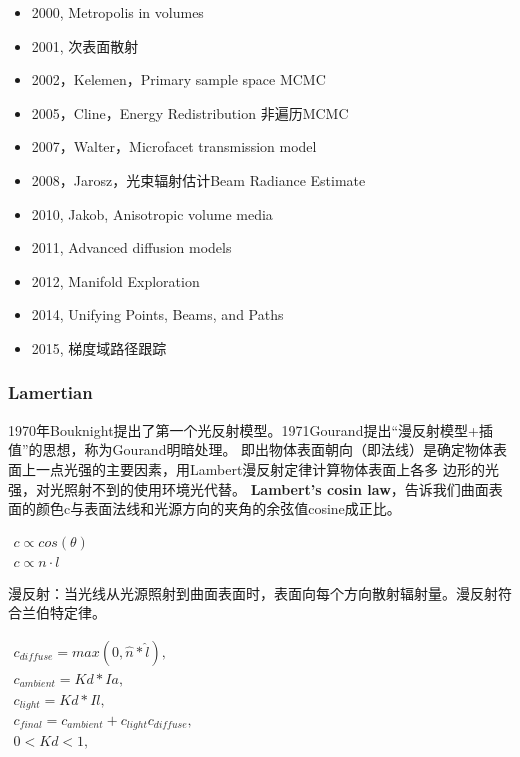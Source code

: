 \begin{itemize}
    \item {2000, Metropolis in volumes}
    \item {2001, 次表面散射}
    \item {2002，Kelemen，Primary sample space MCMC}
    \item {2005，Cline，Energy Redistribution 非遍历MCMC}
    \item {2007，Walter，Microfacet transmission model}
    \item {2008，Jarosz，光束辐射估计Beam Radiance Estimate}
    \item {2010, Jakob, Anisotropic volume media}
    \item {2011, Advanced diffusion models}
    \item {2012, Manifold Exploration}
    \item {2014, Unifying Points, Beams, and Paths}
    \item {2015, 梯度域路径跟踪}
\end{itemize}

\subsubsection{Lamertian}
1970年Bouknight提出了第一个光反射模型。1971Gourand提出“漫反射模型+插值”的思想，称为Gourand明暗处理。
即出物体表面朝向（即法线）是确定物体表面上一点光强的主要因素，用Lambert漫反射定律计算物体表面上各多
边形的光强，对光照射不到的使用环境光代替。
\textbf{Lambert's cosin law}，告诉我们曲面表面的颜色c与表面法线和光源方向的夹角的余弦值cosine成正比。

\begin{math}
\begin{aligned}
c \propto cos(\theta) \\
c \propto n \cdot l 
\end{aligned}
\end{math}

漫反射：当光线从光源照射到曲面表面时，表面向每个方向散射辐射量。漫反射符合兰伯特定律。

\begin{math}
\begin{aligned}    
c_{diffuse} = max(0, \hat{n} * \hat{l}), \\
c_{ambient} = Kd * Ia, \\
c_{light} = Kd * Il, \\ 
c_{final} = c_{ambient} + c_{light}c_{diffuse}, \\
0 < Kd < 1, 
\end{aligned}
\end{math}

